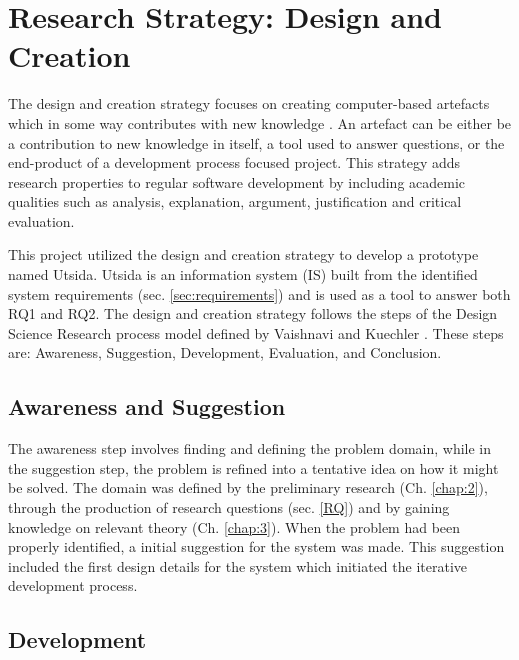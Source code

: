 \section{Research Strategy: Design and Creation}

The design and creation strategy focuses on creating computer-based artefacts which in some way contributes with new knowledge \cite{oates2005researching}. An artefact can be either be a contribution to new knowledge in itself, a tool used to answer questions, or the end-product of a development process focused project. This strategy adds research properties to regular software development by including academic qualities such as analysis, explanation, argument, justification and critical evaluation.

This project utilized the design and creation strategy to develop a prototype named Utsida. Utsida is an information system (IS) built from the identified system requirements (sec. \ref{sec:requirements}) and is used as a tool to answer both RQ1 and RQ2. The design and creation strategy follows the steps of the Design Science Research process model defined by Vaishnavi and Kuechler \cite{vaishnavi2004design}. These steps are: Awareness, Suggestion, Development, Evaluation, and Conclusion.

\subsection{Awareness and Suggestion}
The awareness step involves finding and defining the problem domain, while in the suggestion step, the problem is refined into a tentative idea on how it might be solved. The domain was defined by the preliminary research (Ch. \ref{chap:2}), through the production of research questions (sec. \ref{RQ}) and by gaining knowledge on relevant theory (Ch. \ref{chap:3}). When the problem had been properly identified, a initial suggestion for the system was made. This suggestion included the first design details for the system which initiated the iterative development process.

\subsection{Development}

